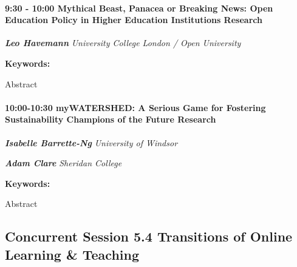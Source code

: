 \documentclass[
]{book}
\begin{document}
\begin{session}
\hypertarget{mythical-beast-panacea-or-breaking-news-open-education-policy-in-higher-education-institutions-research}{%
\paragraph*{\texorpdfstring{9:30 - 10:00 \textbar{} \textbf{Mythical
Beast, Panacea or Breaking News: Open Education Policy in Higher
Education Institutions} \textbar{}
Research}{9:30 - 10:00 \textbar{} Mythical Beast, Panacea or Breaking News: Open Education Policy in Higher Education Institutions \textbar{} Research}}\label{mythical-beast-panacea-or-breaking-news-open-education-policy-in-higher-education-institutions-research}}

\textbf{\emph{Leo Havemann}} \textbar{} \emph{University College London
/ Open University}

\textbf{Keywords:}

Abstract
\end{session}

\begin{session}
\hypertarget{mywatershed-a-serious-game-for-fostering-sustainability-champions-of-the-future-research}{%
\paragraph*{\texorpdfstring{10:00-10:30 \textbar{} \textbf{myWATERSHED:
A Serious Game for Fostering Sustainability Champions of the Future}
\textbar{}
Research}{10:00-10:30 \textbar{} myWATERSHED: A Serious Game for Fostering Sustainability Champions of the Future \textbar{} Research}}\label{mywatershed-a-serious-game-for-fostering-sustainability-champions-of-the-future-research}}

\textbf{\emph{Isabelle Barrette-Ng}} \textbar{} \emph{University of
Windsor}

\textbf{\emph{Adam Clare}} \textbar{} \emph{Sheridan College}

\textbf{Keywords:}

Abstract
\end{session}

\hypertarget{concurrent-session-5.4-transitions-of-online-learning-teaching}{%
\subsection*{Concurrent Session 5.4 \textbar{} Transitions of Online Learning \& Teaching}\label{concurrent-session-5.4-transitions-of-online-learning-teaching}}
\end{document}

